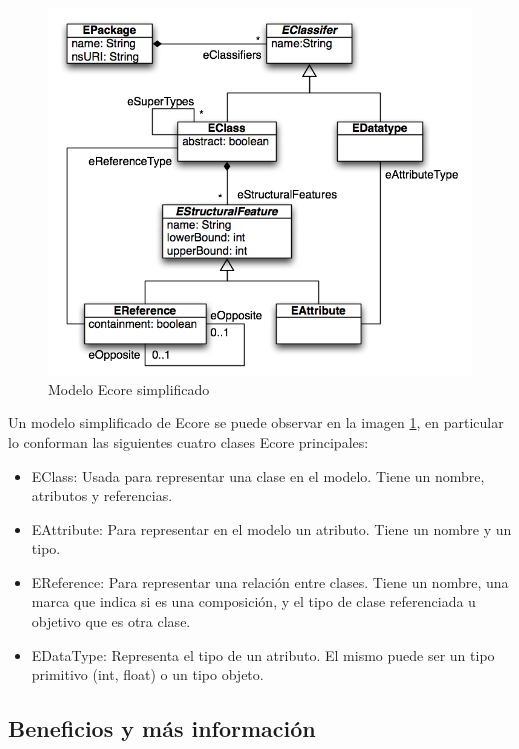 \documentclass[a4paper,12pt,twoside,spanish,openright]{book}
\begin{document}
\begin{figure}[hbtp]
\centering
\includegraphics[scale=1]{./img/Ecore}
\caption{Modelo Ecore simplificado}
\label{fig:EcoreModel}
\end{figure}

Un modelo simplificado de \textsf{Ecore} se puede observar en la imagen \ref{fig:EcoreModel}, en particular lo conforman las siguientes cuatro clases \textsf{Ecore} principales:
\begin{itemize}

\item \textsf{EClass}: Usada para representar una clase en el modelo. Tiene un nombre, atributos y referencias.

\item \textsf{EAttribute}: Para representar en el modelo un atributo. Tiene un nombre y un tipo.

\item \textsf{EReference}: Para representar una relación entre clases. Tiene un nombre, una marca que indica si es una composición, y el tipo de clase referenciada u objetivo que es otra clase.

\item \textsf{EDataType}: Representa el tipo de un atributo. El mismo puede ser un tipo primitivo (\textsf{int}, \textsf{float}) o un tipo objeto.

\end{itemize}

\subsection{Beneficios y más información}
\end{document}
